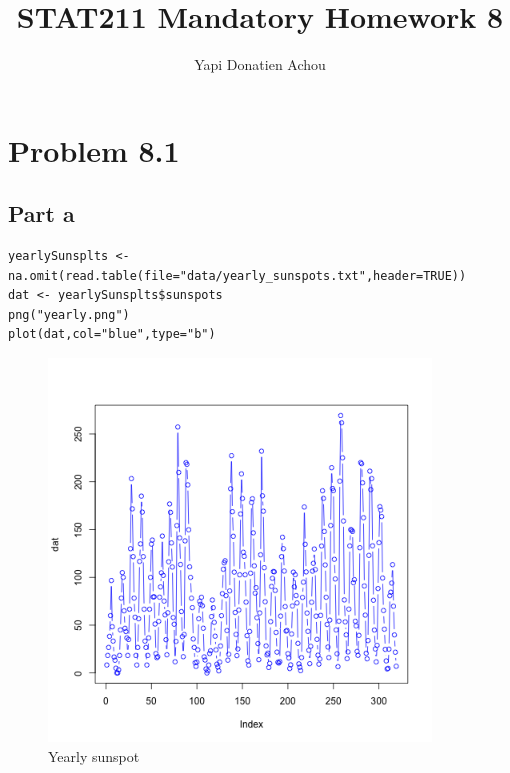 \documentclass[11pt, oneside]{article}   	%
\title{STAT211 Mandatory Homework 8}
\author{Yapi Donatien Achou}
\begin{document}
\maketitle 
\tableofcontents
\newpage
 
 \section{Problem 8.1}
 \subsection{Part a}
 \begin{lstlisting}
yearlySunsplts <- na.omit(read.table(file="data/yearly_sunspots.txt",header=TRUE))
dat <- yearlySunsplts$sunspots
png("yearly.png")
plot(dat,col="blue",type="b")
 \end{lstlisting}
 \begin{figure}[H] %
    \centering
    \includegraphics[width=4in]{yearly.png} 
    \caption{Yearly sunspot}
    \label{fig:example}
 \end{figure}
 
 \clearpage
\end{document}

